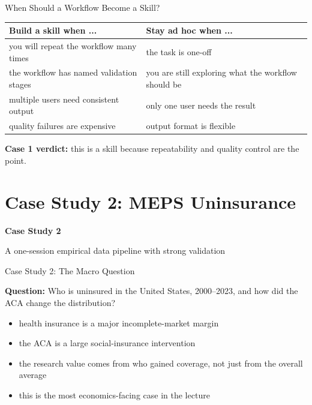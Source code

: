 \documentclass[10pt,english,aspectratio=169]{beamer}
\newcommand{\sectiondivider}[2]{%
\begin{frame}[plain,noframenumbering]
\begin{center}
\vfill
{\Large\textbf{#1}\par}
\vspace{0.35cm}
{\normalsize #2\par}
\vfill
\end{center}
\end{frame}
}
\begin{document}
\begin{frame}{When Should a Workflow Become a Skill?}
\small
\begin{tabular}{p{5.7cm}p{6.0cm}}
\toprule
\textbf{Build a skill when ...} & \textbf{Stay ad hoc when ...} \\
\midrule
you will repeat the workflow many times & the task is one-off \\
the workflow has named validation stages & you are still exploring what the workflow should be \\
multiple users need consistent output & only one user needs the result \\
quality failures are expensive & output format is flexible \\
\bottomrule
\end{tabular}

\vspace{0.3cm}
\textbf{Case 1 verdict:} this is a skill because repeatability and quality control are the point.
\end{frame}

\section{Case Study 2: MEPS Uninsurance}

\sectiondivider{Case Study 2}{A one-session empirical data pipeline with strong validation}

\begin{frame}{Case Study 2: The Macro Question}
\begin{tcolorbox}[colback=blue!3, colframe=RedTitle!60]
\textbf{Question:} Who is uninsured in the United States, 2000--2023, and how did the ACA change the distribution?
\end{tcolorbox}

\vspace{0.25cm}
\begin{itemize}
    \item health insurance is a major incomplete-market margin
    \item the ACA is a large social-insurance intervention
    \item the research value comes from who gained coverage, not just from the overall average
    \item this is the most economics-facing case in the lecture
\end{itemize}
\end{frame}
\end{document}
